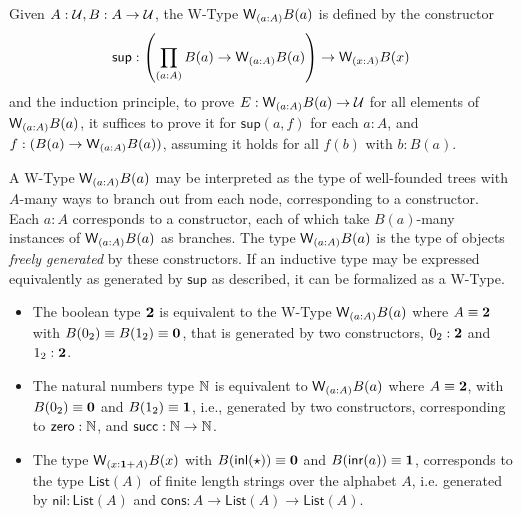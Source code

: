 \begin{definition}[W-Types]
  Given $A : \mathcal{U}, B : A \to \mathcal{U}$, the W-Type $\mathsf{W}_{(a:A)}B(a)$ is defined by the constructor
  \[
    \mathsf{sup} : \left(\prod_{(a:A)}{B(a) \to \mathsf{W}_{(a:A)}B(a)} \right) \to \mathsf{W}_{(x:A)}B(x)
  \]
  and the induction principle, to prove $E : \mathsf{W}_{(a:A)}B(a) \to \mathcal{U}$ for all elements of $\mathsf{W}_{(a:A)}B(a)$, it suffices
  to prove it for $\mathsf{sup}(a,f)$ for each $a : A$, and $f : (B(a) \to \mathsf{W}_{(a:A)}B(a))$, assuming it holds
  for all $f(b)$ with $b : B(a)$.
\end{definition}

A W-Type $\mathsf{W}_{(a:A)}B(a)$ may be interpreted as the type of well-founded trees with $A$-many ways to branch out from
each node, corresponding to a constructor.
Each $a : A$ corresponds to a constructor, each of which take $B(a)$-many instances of $\mathsf{W}_{(a:A)}B(a)$
as branches. The type $\mathsf{W}_{(a:A)}B(a)$ is the type of objects \textit{freely generated} by these constructors.
If an inductive type may be expressed equivalently as generated by $\mathsf{sup}$ as described, it can be formalized as a W-Type.

\begin{itemize}
  \item The boolean type $\mathbf{2}$ is equivalent to the W-Type $\mathsf{W}_{(a:A)}B(a)$ where 
    $A \equiv \mathbf{2}$ with $B(0_2) \equiv B(1_2) \equiv \mathbf{0}$, that is generated by 
    two constructors, $0_2 : \mathbf{2}$ and $1_2 : \mathbf{2}$.
  \item The natural numbers type $\mathbb{N}$ is equivalent to $\mathsf{W}_{(a:A)}B(a)$ where $A \equiv \mathbf{2}$,
    with $B(0_2) \equiv \mathbf{0}$ and $B(1_2) \equiv \mathbf{1}$, i.e., generated by two constructors,
    corresponding to $\mathsf{zero : \mathbb{N}}$, and $\mathsf{succ} : \mathbb{N} \to \mathbb{N}$.
  \item The type $\mathsf{W}_{(x:\mathbf{1}+A)}B(x)$ with $B(\mathsf{inl} (\star)) \equiv \mathbf{0}$ and $B(\mathsf{inr} (a)) \equiv \mathbf{1}$,
    corresponds to the type $\mathsf{List}(A)$ of finite length strings over the alphabet $A$, i.e.
    generated by $\mathsf{nil} : \mathsf {List}(A)$ and $\mathsf{cons} : A \to \mathsf{List}(A) \to \mathsf{List}(A)$.
\end{itemize}
